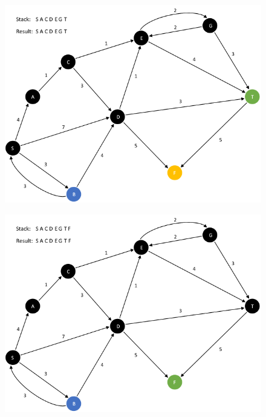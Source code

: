 \documentclass{article}
\begin{document}
\begin{enumerate}[leftmargin=\labelsep]
\begin{figure}[H]
\centering
\includegraphics[scale=0.6]{images/Q5/a/07.png}
\end{figure}

\begin{figure}[H]
\centering
\includegraphics[scale=0.6]{images/Q5/a/08.png}
\end{figure}


\end{enumerate}
\end{document}

